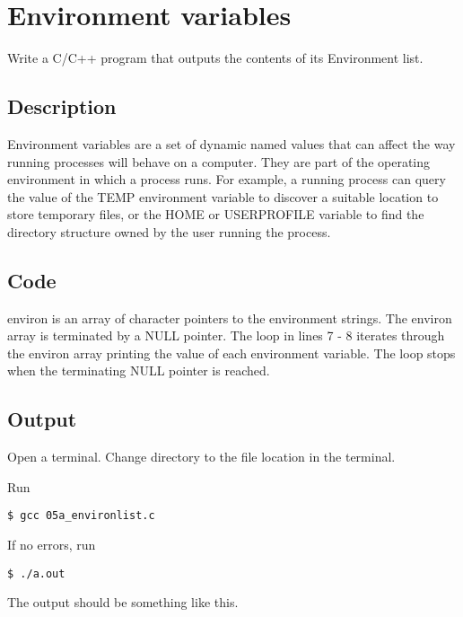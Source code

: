 \chapter{Environment variables}

Write a C/C++ program that outputs the contents of its Environment list.

\section{Description}


Environment variables are a set of dynamic named values that can affect the way running processes will behave on a computer. They are part of the operating environment in which a process runs. For example, a running process can query the value of the TEMP environment variable to discover a suitable location to store temporary files, or the HOME or USERPROFILE variable to find the directory structure owned by the user running the process.
	

\section{Code}



environ is an array of character pointers to the environment strings. The environ array is terminated by a NULL pointer. The loop in lines 7 - 8 iterates through the environ array printing the value of each environment variable. The loop stops when the terminating NULL pointer is reached.

\section{Output}

Open a terminal. Change directory to the file location in the terminal.

Run
\begin{lstlisting}[style=shell-command]
$ gcc 05a_environlist.c
\end{lstlisting}

If no errors, run
\begin{lstlisting}[style=shell-command]
$ ./a.out
\end{lstlisting}

The output should be something like this.

